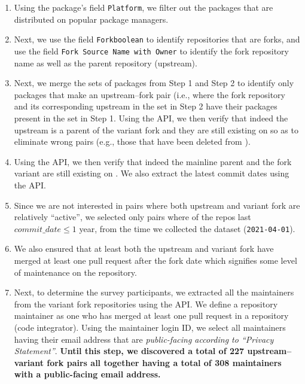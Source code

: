 \begin{enumerate}[label=\alph*.]
\item  Using the package's field \texttt{Platform}, we filter out the packages that are distributed on popular package managers.

\item Next, we use the field \texttt{Forkboolean} to identify repositories that are forks, and use the field \texttt{Fork Source Name with Owner} to identify the fork repository name as well as the parent repository (upstream).

\item Next, we merge the sets of packages from Step 1 and Step 2 to identify only packages that make an upstream--fork pair (i.e., where the fork repository and its corresponding upstream in the set in Step 2 have their packages present in the set in Step 1. Using the \gh API, we then verify that indeed the upstream is a parent of the variant fork and they are still existing on \gh so as to eliminate wrong pairs (e.g., those that have been deleted from \gh). 

\item Using the \gh API, we then verify that indeed the mainline parent and the fork variant are still existing on \gh. We also extract the latest commit dates using the \gh API.

\item \label{sec:active} Since we are not interested in pairs where both upstream and variant fork are relatively ``active'', we selected only pairs where of the repos last $commit\_date \leq 1$ year, from the time we collected the dataset (\texttt{2021-04-01}). 

\item \label{sec:pr} We also ensured that at least both the upstream and variant fork have merged at least one pull request after the fork date which signifies some level of maintenance on the repository.  %

\item \label{sec:email} Next, to determine the survey participants, we extracted all the maintainers from the variant fork repositories using the \gh API. We define a repository maintainer as one who has merged at least one pull request in a repository (code integrator). Using the maintainer login ID, we select all maintainers having their email address that are \textit{public-facing according to ``\gh Privacy Statement''}. \textbf{Until this step, we discovered a total of 227 upstream--variant fork pairs all together having a total of 308 maintainers with a public-facing email address.}

\end{enumerate}

